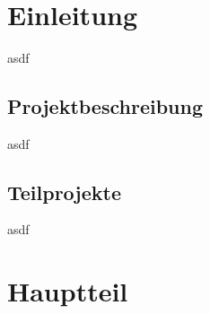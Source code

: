 \documentclass[12pt,a4paper]{scrreprt}
\begin{document}
\begin{figure}
 \\
\end{figure}
\thispagestyle{empty} %
 \tableofcontents
\thispagestyle{empty} 
\chapter{Einleitung}
asdf
\section{Projektbeschreibung}
asdf
\section{Teilprojekte}
asdf
\chapter{Hauptteil}
\end{document}
